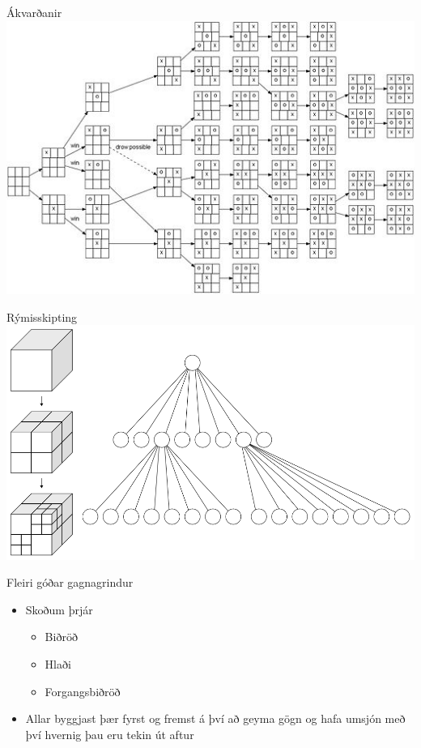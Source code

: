 \documentclass{beamer}
\begin{document}
\begin{frame}{Ákvarðanir}
\includegraphics[width=\textwidth]{Pics/tictactoe}
\end{frame}

\begin{frame}{Rýmisskipting}
\includegraphics[width=\textwidth]{Pics/octree}
\end{frame}

\begin{frame}{Fleiri góðar gagnagrindur}
\begin{itemize}
 \item Skoðum þrjár
 \begin{itemize}
  \item Biðröð
  \item Hlaði
  \item Forgangsbiðröð
 \end{itemize}
 \item Allar byggjast þær fyrst og fremst á því að geyma gögn og hafa umsjón með því hvernig þau eru tekin út aftur
\end{itemize}
\end{frame}
\end{document}
